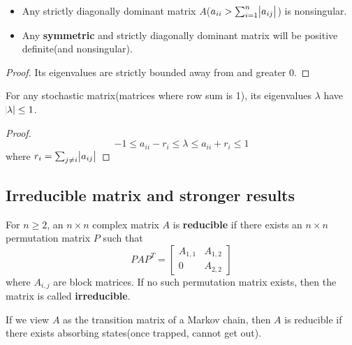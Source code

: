 \begin{refsection}
\begin{corollary}\label{ch:linearalgebra:th:diagonallydominantmatrixproperty}\hfill
	\begin{itemize}
		\item 	Any strictly diagonally dominant matrix $A$($a_{ii} > \sum_{i=1}^n \abs{a_{ij}}$) is nonsingular.
		\item Any \textbf{symmetric} and strictly diagonally dominant matrix will be positive definite(and nonsingular). 
	\end{itemize}
\end{corollary}
\begin{proof}
	Its eigenvalues are strictly bounded away from and greater 0.
\end{proof}

\begin{corollary}\label{ch:linearalgebra:th:spectralpropertystochasticmatrix}
For any stochastic matrix(matrices where row sum is 1), its eigenvalues $\lambda$ have $\abs{\lambda} \leq 1$.
\end{corollary}
\begin{proof}
	$$-1\leq a_{ii} - r_i \leq \lambda \leq a_{ii} + r_i \leq 1$$
	where $r_i = \sum_{j\neq i}\abs{a_{ij}}$
\end{proof}



\subsection{Irreducible matrix and stronger results}
\begin{definition}\cite[18]{varga2009matrix}
For $n\geq 2$, an $n\times n$ complex matrix $A$ is \textbf{reducible} if there exists an $n\times n$ permutation matrix $P$ such that
$$PAP^T = \begin{bmatrix}
A_{1,1} & A_{1,2}\\
0 & A_{2,2}
\end{bmatrix}$$
where $A_{i,j}$ are block matrices. 
If no such permutation matrix exists, then the matrix is called \textbf{irreducible}.
\end{definition}

\begin{remark}[interpretation]
If we view $A$ as the transition matrix of a Markov chain, then $A$ is reducible if there exists absorbing states(once trapped, cannot get out).
\end{remark}


\end{refsection}
